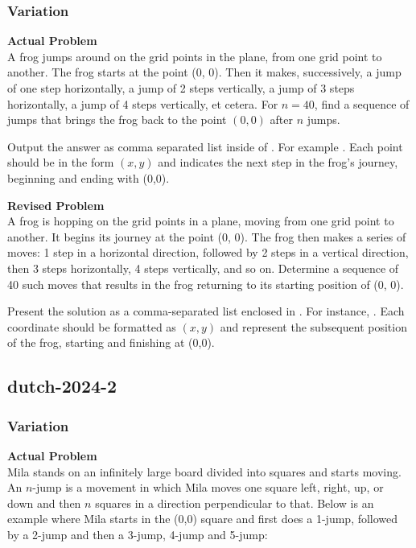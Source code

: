 \subsubsection{Variation}
\textbf{Actual Problem}\\
A frog jumps around on the grid points in the plane, from one grid point to another. The frog starts at the point (0, 0). Then it makes, successively, a jump of one step horizontally, a jump of 2 steps vertically, a jump of 3 steps horizontally, a jump of 4 steps vertically, et cetera. For $n = 40$, find a sequence of jumps that brings the frog back to the point $(0, 0)$ after $n$ jumps.

Output the answer as comma separated list inside of . For example . Each point should be in the form $(x, y)$ and indicates the next step in the frog's journey, beginning and ending with (0,0).

\textbf{Revised Problem}\\
A frog is hopping on the grid points in a plane, moving from one grid point to another. It begins its journey at the point (0, 0). The frog then makes a series of moves: 1 step in a horizontal direction, followed by 2 steps in a vertical direction, then 3 steps horizontally, 4 steps vertically, and so on. Determine a sequence of 40 such moves that results in the frog returning to its starting position of (0, 0).

Present the solution as a comma-separated list enclosed in . For instance, . Each coordinate should be formatted as $(x, y)$ and represent the subsequent position of the frog, starting and finishing at (0,0).

\subsection{dutch-2024-2}
\subsubsection{Variation}
\textbf{Actual Problem}\\
Mila stands on an infinitely large board divided into squares and starts moving. An $n$-jump is a movement in which Mila moves one square left, right, up, or down and then $n$ squares in a direction perpendicular to that. Below is an example where Mila starts in the (0,0) square and first does a 1-jump, followed by a 2-jump and then a 3-jump, 4-jump and 5-jump:

